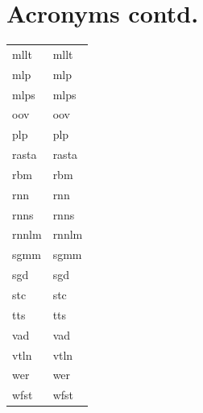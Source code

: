 \documentclass[12pt,twoside]{report}
\begin{document}
\clearpage
\begin{table}[tp]
  \label{tab:acronymns2}
\section*{Acronyms contd.}
\begin{tabular}{ll}
  \acrshort{mllt} & \acrlong{mllt} \\
  \acrshort{mlp} & \acrlong{mlp} \\
  \acrshort{mlps} & \acrlong{mlps} \\
  \acrshort{oov} & \acrlong{oov} \\
  \acrshort{plp} & \acrlong{plp} \\
  \acrshort{rasta} & \acrlong{rasta} \\
  \acrshort{rbm} & \acrlong{rbm} \\
  \acrshort{rnn} & \acrlong{rnn} \\
  \acrshort{rnns} & \acrlong{rnns} \\
  \acrshort{rnnlm} & \acrlong{rnnlm} \\
  \acrshort{sgmm} & \acrlong{sgmm} \\
  \acrshort{sgd} & \acrlong{sgd} \\
  \acrshort{stc} & \acrlong{stc} \\
  \acrshort{tts} & \acrlong{tts} \\
  \acrshort{vad} & \acrlong{vad} \\
  \acrshort{vtln} & \acrlong{vtln} \\
  \acrshort{wer} & \acrlong{wer} \\
  \acrshort{wfst} & \acrlong{wfst} 
\end{tabular}
\end{table}
\clearpage
\end{document}
